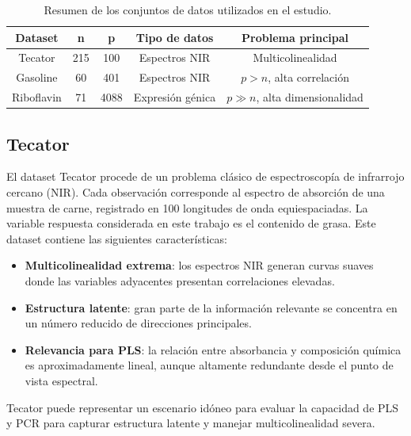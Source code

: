\documentclass[12pt,a4paper]{report}
\begin{document}
\begin{table}[H]
\centering
\small
\caption{Resumen de los conjuntos de datos utilizados en el estudio.}
\label{tabla:datasets}
\begin{tabular}{|c|c|c|c|c|}
\hline
\textbf{Dataset} & \textbf{n} & \textbf{p} & \textbf{Tipo de datos} & \textbf{Problema principal} \\
\hline \hline
Tecator    & 215 & 100  & Espectros NIR        & Multicolinealidad \\ \hline
Gasoline   & 60  & 401  & Espectros NIR        & $p>n$, alta correlación \\ \hline
Riboflavin & 71  & 4088 & Expresión génica     & $p \gg n$, alta dimensionalidad \\ \hline
\end{tabular}

\end{table}

\subsection{Tecator}

El dataset Tecator procede de un problema clásico de espectroscopía de infrarrojo cercano (NIR). Cada observación corresponde al espectro de absorción de una muestra de carne, registrado en 100 longitudes de onda equiespaciadas. La variable respuesta considerada en este trabajo es el contenido de grasa. Este dataset contiene las siguientes características:

\begin{itemize}
    \item \textbf{Multicolinealidad extrema}: los espectros NIR generan curvas suaves donde las variables adyacentes presentan correlaciones elevadas.

    \item \textbf{Estructura latente}: gran parte de la información relevante se concentra en un número reducido de direcciones principales.

    \item \textbf{Relevancia para PLS}: la relación entre absorbancia y composición química es aproximadamente lineal, aunque altamente redundante desde el punto de vista espectral.
\end{itemize}

Tecator puede representar un escenario idóneo para evaluar la capacidad de PLS y PCR para capturar estructura latente y manejar multicolinealidad severa.
\end{document}
